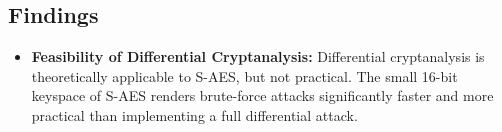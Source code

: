 \documentclass{article}
\begin{document}
\subsection{Findings}
\begin{itemize}
    \item \textbf{Feasibility of Differential Cryptanalysis:} Differential cryptanalysis is theoretically applicable to S-AES, but not practical. The small 16-bit keyspace of S-AES renders brute-force attacks significantly faster and more practical than implementing a full differential attack.
\end{itemize}
\end{document}
